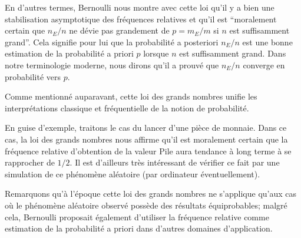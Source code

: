 \documentclass[11pt,a4paper]{article}
\begin{document}
En d'autres termes, Bernoulli nous montre avec cette loi qu'il y a bien une stabilisation asymptotique des fréquences relatives et qu'il est ``moralement certain que $n_E/n$ ne dévie pas grandement de $p = m_E/m$ si $n$ est suffisamment grand''. Cela signifie pour lui que la probabilité a posteriori $n_E/n$ est une bonne estimation de la probabilité a priori $p$ lorsque $n$ est suffisamment grand. Dans notre terminologie moderne, nous dirons qu'il a prouvé que $n_E/n$ converge en probabilité vers $p$.

Comme mentionné auparavant, cette loi des grands nombres unifie les interprétations classique et fréquentielle de la notion de probabilité.

En guise d'exemple, traitons le cas du lancer d'une pièce de monnaie. Dans ce cas, la loi des grands nombres nous affirme qu'il est moralement certain que la fréquence relative d'obtention de la valeur Pile aura tendance à long terme à se rapprocher de $1/2$. Il est d'ailleurs très intéressant de vérifier ce fait par une simulation de ce phénomène aléatoire (par ordinateur éventuellement).

Remarquons qu'à l'époque cette loi des grands nombres ne s'applique qu'aux cas où le phénomène aléatoire observé possède des résultats équiprobables; malgré cela, Bernoulli proposait également d'utiliser la fréquence relative comme estimation de la probabilité a priori dans d'autres domaines d'application.
\end{document}
